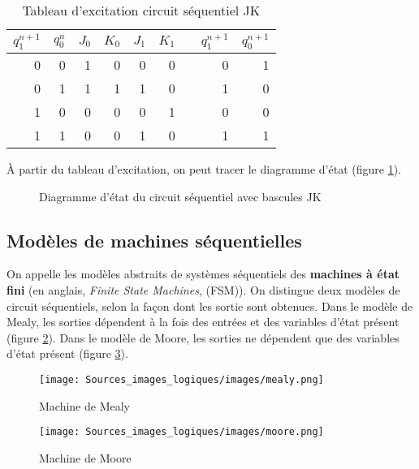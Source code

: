 \documentclass[11pt]{article}
\begin{document}
\begin{table}[htbp]
\caption{\label{tab:org9f69f32}Tableau d'excitation circuit séquentiel JK}
\centering
\begin{tabular}{rrrrrrlrr}
\(q_1^{n+1}\) & \(q_0^n\) & \(J_0\) & \(K_0\) & \(J_1\) & \(K_1\) &  & \(q_1^{n+1}\) & \(q_0^{n+1}\)\\
\hline
0 & 0 & 1 & 0 & 0 & 0 &  & 0 & 1\\
0 & 1 & 1 & 1 & 1 & 0 &  & 1 & 0\\
1 & 0 & 0 & 0 & 0 & 1 &  & 0 & 0\\
1 & 1 & 0 & 0 & 1 & 0 &  & 1 & 1\\
\end{tabular}
\end{table}

À partir du tableau d'excitation, on peut tracer le diagramme d'état
(figure \ref{fig:org2aea7ec}).

\begin{figure}[htbp]
\centering

\caption{\label{fig:org2aea7ec}Diagramme d'état du circuit séquentiel avec bascules JK}
\end{figure}

\subsection{Modèles de machines séquentielles}
\label{sec:org7a92b1f}

On appelle les modèles abstraits de systèmes séquentiels des \textbf{machines
à état fini} (en anglais, \emph{Finite State Machines}, (FSM)).  On
distingue deux modèles de circuit séquentiels, selon la façon dont les
sortie sont obtenues. Dans le modèle de Mealy, les sorties dépendent à
la fois des entrées et des variables d'état présent (figure \ref{fig:org88d0cbc}). Dans
le modèle de Moore, les sorties ne dépendent que des variables d'état présent
(figure \ref{fig:orga5229a4}). 

\begin{figure}[htbp]
\centering
\texttt{[image: Sources\_images\_logiques/images/mealy.png]}
\caption{\label{fig:org88d0cbc}Machine de Mealy}
\end{figure}

\begin{figure}[htbp]
\centering
\texttt{[image: Sources\_images\_logiques/images/moore.png]}
\caption{\label{fig:orga5229a4}Machine de Moore}
\end{figure}
\end{document}
